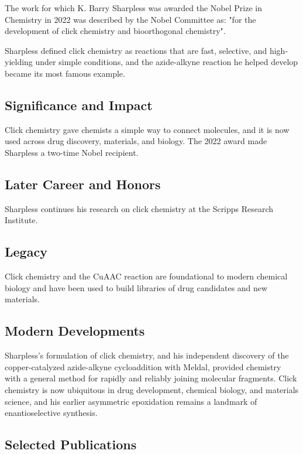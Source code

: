 The work for which K. Barry Sharpless was awarded the Nobel Prize in Chemistry in 2022 was described by the Nobel Committee as: "for the development of click chemistry and bioorthogonal chemistry".

Sharpless defined click chemistry as reactions that are fast, selective, and high-yielding under simple conditions, and the azide-alkyne reaction he helped develop became its most famous example.

\subsection*{Significance and Impact}

Click chemistry gave chemists a simple way to connect molecules, and it is now used across drug discovery, materials, and biology. The 2022 award made Sharpless a two-time Nobel recipient.

\subsection*{Later Career and Honors}

Sharpless continues his research on click chemistry at the Scripps Research Institute.

\subsection*{Legacy}

Click chemistry and the CuAAC reaction are foundational to modern chemical biology and have been used to build libraries of drug candidates and new materials.

\subsection*{Modern Developments}

Sharpless's formulation of click chemistry, and his independent discovery of the copper-catalyzed azide-alkyne cycloaddition with Meldal, provided chemistry with a general method for rapidly and reliably joining molecular fragments. Click chemistry is now ubiquitous in drug development, chemical biology, and materials science, and his earlier asymmetric epoxidation remains a landmark of enantioselective synthesis.

\subsection*{Selected Publications}


